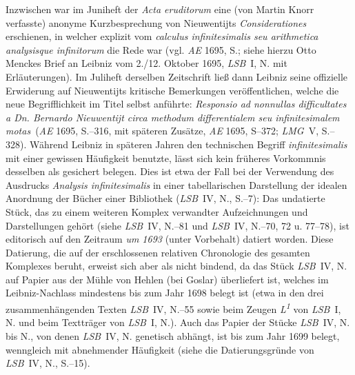 Inzwischen war im Juniheft der \textit{Acta eruditorum} eine (von Martin Knorr verfasste) anonyme Kurzbesprechung von Nieuwentijts \textit{Considerationes} erschienen, in welcher explizit vom \textit{calculus infinitesimalis seu arithmetica analysisque infinitorum} die Rede war (vgl. \textit{AE} 1695, S.;\cite{02505}\cite{01023} siehe hierzu Otto Menckes Brief an Leibniz vom 2./12. Oktober 1695, \textit{LSB}~I, N. mit Erläuterungen).\cite{02506}
Im Juliheft derselben Zeitschrift ließ dann Leibniz seine offizielle Erwiderung auf Nieuwentijts kritische Bemerkungen veröffentlichen, welche die neue Begrifflichkeit im Titel selbst anführte: \textit{Responsio ad nonnullas difficultates a Dn. Bernardo Nieuwentijt circa methodum differentialem seu infinitesimalem motas}\ (\textit{AE} 1695, S.--316, mit späteren \glqq Zusätze\grqq, \textit{AE} 1695, S--372; \textit{LMG}~V, S.--328).%
\pend%
\pstart%
Während Leibniz in späteren Jahren den technischen Begriff \textit{infinitesimalis} mit einer gewissen Häufigkeit benutzte, lässt sich kein früheres Vorkommnis desselben als gesichert belegen.
Dies ist etwa der Fall bei der Verwendung des Ausdrucks \textit{Analysis infinitesimalis} in einer tabellarischen Darstellung der idealen Anordnung der Bücher einer Bibliothek (\textit{LSB}~IV, N., S.--7):\cite{02509}
Das undatierte Stück, das zu einem weiteren Komplex verwandter Aufzeichnungen und Darstellungen gehört (siehe \textit{LSB}~IV, N.--81 und \textit{LSB}~IV, N.--70, 72 u. 77--78), ist editorisch auf den Zeitraum \textit{um 1693} (unter Vorbehalt) datiert worden.
Diese Datierung, die auf der erschlossenen relativen Chronologie des gesamten Komplexes beruht, erweist sich aber als nicht bindend, da das Stück \textit{LSB}~IV, N. auf Papier aus der Mühle von Hehlen (bei Goslar) überliefert ist, welches im Leibniz-Nachlass mindestens bis zum Jahr 1698 belegt ist (etwa in den drei zusammenhängenden Texten \textit{LSB}~IV, N.--55\cite{02510}\cite{02511}\cite{02512} sowie beim Zeugen \textit{L\textsuperscript{1}} von \textit{LSB}~I, N.\cite{02513} und beim Textträger von \textit{LSB}~I, N.).\cite{02514}
Auch das Papier der Stücke \textit{LSB}~IV, N. bis N., von denen \textit{LSB}~IV, N.\cite{02509} genetisch abhängt, ist bis zum Jahr 1699 belegt, wenngleich mit abnehmender Häufigkeit (siehe die Datierungsgründe von \textit{LSB}~IV, N., S.--15).\cite{02515}
